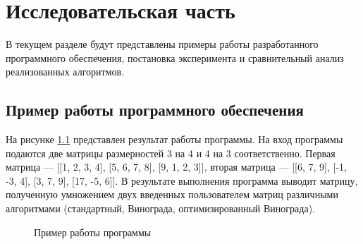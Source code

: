 \chapter{Исследовательская часть}
В текущем разделе будут представлены примеры работы разработанного программного обеспечения, постановка эксперимента и сравнительный анализ реализованных алгоритмов.

\section{Пример работы программного обеспечения}

На рисунке \ref{fig:prog_exmpl} представлен результат работы программы.
На вход программы подаются две матрицы размерностей 3 на 4 и 4 на 3 соответственно.
Первая матрица --- [[1, 2, 3, 4], [5, 6, 7, 8], [9, 1, 2, 3]], вторая матрица --- [[6, 7, 9], [-1, -3, 4], [3, 7, 9], [17, -5, 6]].
В результате выполнения программа выводит матрицу, полученную умножением двух введенных пользователем матриц различными алгоритмами (стандартный, Винограда, оптимизированный Винограда).

\begin{figure}[h!]
	
	
	\caption{Пример работы программы}
	
	\label{fig:prog_exmpl}
	
\end{figure}

